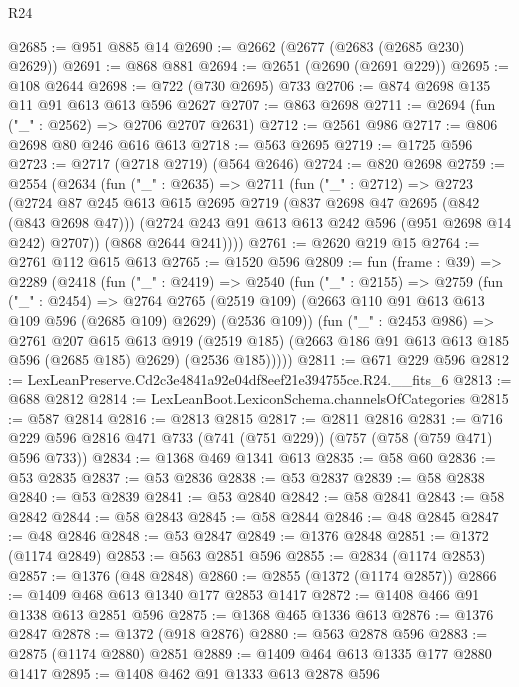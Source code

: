 \begin{lexlean}{R24}
\begin{coremodule}
@2685 := @951 @885 @14
@2690 := @2662 (@2677 (@2683 (@2685 @230) @2629))
@2691 := @868 @881
@2694 := @2651 (@2690 (@2691 @229))
@2695 := @108 @2644
@2698 := @722 (@730 @2695) @733
@2706 := @874 @2698 @135 @11 @91 @613 @613 @596 @2627
@2707 := @863 @2698
@2711 := @2694 (fun ("_" : @2562) => @2706 @2707 @2631)
@2712 := @2561 @986
@2717 := @806 @2698 @80 @246 @616 @613
@2718 := @563 @2695
@2719 := @1725 @596
@2723 := @2717 (@2718 @2719) (@564 @2646)
@2724 := @820 @2698
@2759 := @2554
    (@2634
      (fun ("_" : @2635) =>
      @2711
        (fun ("_" : @2712) =>
        @2723
          (@2724
            @87
            @245
            @613
            @615
            @2695
            @2719
            (@837 @2698 @47 @2695 (@842 (@843 @2698 @47)))
            (@2724 @243 @91 @613 @613 @242 @596 (@951 @2698 @14 @242) @2707))
          (@868 @2644 @241))))
@2761 := @2620 @219 @15
@2764 := @2761 @112 @615 @613
@2765 := @1520 @596
@2809 := fun (frame : @39) =>
  @2289
    (@2418
      (fun ("_" : @2419) =>
      @2540
        (fun ("_" : @2155) =>
        @2759
          (fun ("_" : @2454) =>
          @2764
            @2765
            (@2519 @109)
            (@2663 @110 @91 @613 @613 @109 @596 (@2685 @109) @2629)
            (@2536 @109))
          (fun ("_" : @2453 @986) =>
          @2761
            @207
            @615
            @613
            @919
            (@2519 @185)
            (@2663 @186 @91 @613 @613 @185 @596 (@2685 @185) @2629)
            (@2536 @185)))))
@2811 := @671 @229 @596
@2812 := LexLeanPreserve.Cd2c3e4841a92e04df8eef21e394755ce.R24.__fits_6
@2813 := @688 @2812
@2814 := LexLeanBoot.LexiconSchema.channelsOfCategories
@2815 := @587 @2814
@2816 := @2813 @2815
@2817 := @2811 @2816
@2831 := @716 @229 @596 @2816 @471 @733 (@741 (@751 @229)) (@757 (@758 (@759 @471) @596 @733))
@2834 := @1368 @469 @1341 @613
@2835 := @58 @60
@2836 := @53 @2835
@2837 := @53 @2836
@2838 := @53 @2837
@2839 := @58 @2838
@2840 := @53 @2839
@2841 := @53 @2840
@2842 := @58 @2841
@2843 := @58 @2842
@2844 := @58 @2843
@2845 := @58 @2844
@2846 := @48 @2845
@2847 := @48 @2846
@2848 := @53 @2847
@2849 := @1376 @2848
@2851 := @1372 (@1174 @2849)
@2853 := @563 @2851 @596
@2855 := @2834 (@1174 @2853)
@2857 := @1376 (@48 @2848)
@2860 := @2855 (@1372 (@1174 @2857))
@2866 := @1409 @468 @613 @1340 @177 @2853 @1417
@2872 := @1408 @466 @91 @1338 @613 @2851 @596
@2875 := @1368 @465 @1336 @613
@2876 := @1376 @2847
@2878 := @1372 (@918 @2876)
@2880 := @563 @2878 @596
@2883 := @2875 (@1174 @2880) @2851
@2889 := @1409 @464 @613 @1335 @177 @2880 @1417
@2895 := @1408 @462 @91 @1333 @613 @2878 @596

\end{coremodule}
\end{lexlean}
